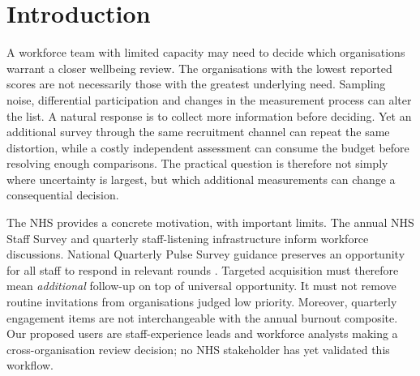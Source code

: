 \begin{abstract}
Workforce wellbeing surveys can guide which organisations receive closer review, but collecting more responses need not resolve uncertainty about that decision. We study a fixed budget for additional measurement before allocating a fixed number of review slots. An ordinary channel may share a persistent organisation-specific offset; a more expensive validation channel measures a reference target only under an explicit validity assumption. We specialise existing Gaussian knowledge gradient to this decision and distinguish three phenomena: irreducible ranking uncertainty from unit-specific offsets, harmless shared shifts under within-group quotas, and finite-budget losses from costly or invalid validation. Controlled Gaussian experiments show both gains and reversals. A temporally separated benchmark uses 206,098 employed-adult BRFSS records from 2023 for calibration and 214,151 from 2024 for hidden-record replay across 48 areas. Under a controlled recruitment tilt and validation cost five, two-channel knowledge gradient increases severity regret from 0.1615 to 0.1857 at budget 144, despite slightly reducing estimation error. NHS aggregate data provide a separate conditional illustration, not an intervention evaluation. The contribution is an auditable decision benchmark and a characterisation of when additional measurement can fail; neither a new acquisition algorithm nor improved employee health is claimed.
\end{abstract}

\section{Introduction}
A workforce team with limited capacity may need to decide which organisations warrant a closer wellbeing review. The organisations with the lowest reported scores are not necessarily those with the greatest underlying need. Sampling noise, differential participation and changes in the measurement process can alter the list. A natural response is to collect more information before deciding. Yet an additional survey through the same recruitment channel can repeat the same distortion, while a costly independent assessment can consume the budget before resolving enough comparisons. The practical question is therefore not simply where uncertainty is largest, but which additional measurements can change a consequential decision.

The NHS provides a concrete motivation, with important limits. The annual NHS Staff Survey and quarterly staff-listening infrastructure inform workforce discussions. National Quarterly Pulse Survey guidance preserves an opportunity for all staff to respond in relevant rounds \citep{dom_nqps2023}. Targeted acquisition must therefore mean \emph{additional} follow-up on top of universal opportunity. It must not remove routine invitations from organisations judged low priority. Moreover, quarterly engagement items are not interchangeable with the annual burnout composite. Our proposed users are staff-experience leads and workforce analysts making a cross-organisation review decision; no NHS stakeholder has yet validated this workflow.

